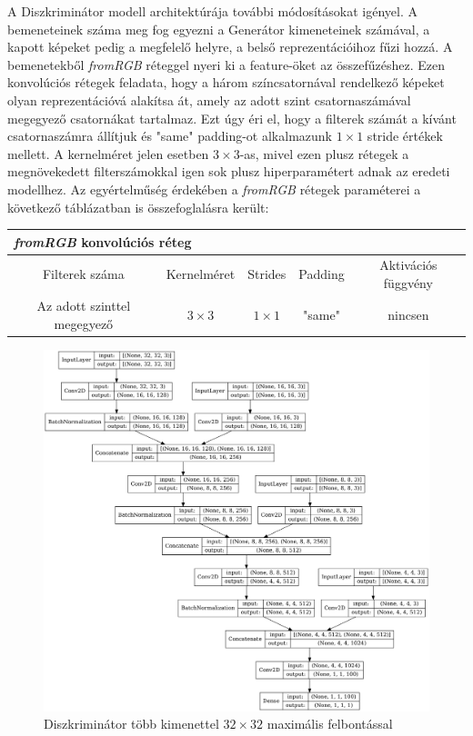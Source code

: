 A Diszkriminátor modell architektúrája további módosításokat igényel. A bemeneteinek száma meg fog egyezni a Generátor kimeneteinek számával, a kapott képeket pedig a megfelelő helyre, a belső reprezentációihoz fűzi hozzá. A bemenetekből \textit{fromRGB} réteggel nyeri ki a feature-öket az összefűzéshez.
Ezen konvolúciós rétegek feladata, hogy a három színcsatornával rendelkező képeket olyan reprezentációvá alakítsa át, amely az adott szint csatornaszámával megegyező csatornákat tartalmaz. Ezt úgy éri el, hogy a filterek számát a kívánt csatornaszámra állítjuk és "same" padding-ot alkalmazunk $ 1 \times 1 $ stride értékek mellett. A kernelméret jelen esetben $ 3 \times 3 $-as, mivel ezen plusz rétegek a megnövekedett filterszámokkal igen sok plusz hiperparamétert adnak az eredeti modellhez.
Az egyértelműség érdekében a \textit{fromRGB} rétegek paraméterei a következő táblázatban is összefoglalásra került:
\small{
	\begin{center}
		\begin{tabular}{ c|c|c|c|c }
			\multicolumn{5}{l}{\textbf{\textit{fromRGB} konvolúciós réteg}} \\
			\hline
			Filterek száma & Kernelméret & Strides & Padding & Aktivációs függvény\\
			\hline
			Az adott szinttel megegyező & $3 \times 3$ & $1 \times 1$ & "same" & nincsen\\
		\end{tabular}
	\end{center}
}

\begin{figure}[h]
	\centering
	\includegraphics[width=15cm]{images/msgDiscriminator.png}
	\caption{Diszkriminátor több kimenettel $32 \times 32$ maximális felbontással}
	\label{fig:msgDiscriminator}
\end{figure}
